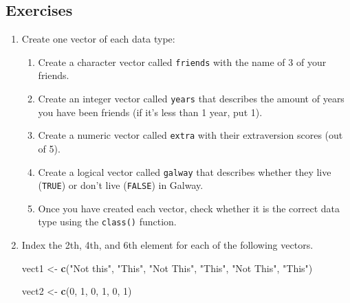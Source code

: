 \documentclass[
]{book}
\newenvironment{Shaded}{\begin{snugshade}}{\end{snugshade}}
\newcommand{\DecValTok}[1]{\textcolor[rgb]{0.00,0.00,0.81}{#1}}
\newcommand{\FunctionTok}[1]{\textcolor[rgb]{0.13,0.29,0.53}{\textbf{#1}}}
\newcommand{\NormalTok}[1]{#1}
\newcommand{\OtherTok}[1]{\textcolor[rgb]{0.56,0.35,0.01}{#1}}
\newcommand{\StringTok}[1]{\textcolor[rgb]{0.31,0.60,0.02}{#1}}
\begin{document}
\hypertarget{exercises-3}{%
\subsection{Exercises}\label{exercises-3}}

\begin{enumerate}
\def\labelenumi{\arabic{enumi}.}
\item
  Create one vector of each data type:

  \begin{enumerate}
  \def\labelenumii{\arabic{enumii}.}
  \item
    Create a character vector called \texttt{friends} with the name of 3 of your friends.
  \item
    Create an integer vector called \texttt{years} that describes the amount of years you have been friends (if it's less than 1 year, put 1).
  \item
    Create a numeric vector called \texttt{extra} with their extraversion scores (out of 5).
  \item
    Create a logical vector called \texttt{galway} that describes whether they live (\texttt{TRUE}) or don't live (\texttt{FALSE}) in Galway.
  \item
    Once you have created each vector, check whether it is the correct data type using the \texttt{class()} function.
  \end{enumerate}
\item
  Index the 2th, 4th, and 6th element for each of the following vectors.

\begin{Shaded}
\begin{Highlighting}[]
\NormalTok{vect1 }\OtherTok{\textless{}{-}} \FunctionTok{c}\NormalTok{(}\StringTok{"Not this"}\NormalTok{, }\StringTok{"This"}\NormalTok{, }\StringTok{"Not This"}\NormalTok{, }\StringTok{"This"}\NormalTok{, }\StringTok{"Not This"}\NormalTok{, }\StringTok{"This"}\NormalTok{)}

\NormalTok{vect2 }\OtherTok{\textless{}{-}} \FunctionTok{c}\NormalTok{(}\DecValTok{0}\NormalTok{, }\DecValTok{1}\NormalTok{, }\DecValTok{0}\NormalTok{, }\DecValTok{1}\NormalTok{, }\DecValTok{0}\NormalTok{, }\DecValTok{1}\NormalTok{)}


\end{Highlighting}
\end{Shaded}
\end{enumerate}
\end{document}
